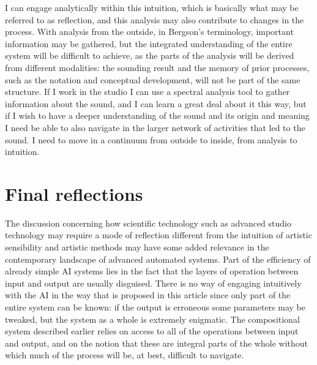 \documentclass[11pt]{article}
\begin{document}
I can engage analytically within this intuition, which is basically what may be referred to as reflection, and this analysis may also contribute to changes in the process.
With analysis from the outside, in Bergson's terminology, important information may be gathered, but the integrated understanding of the entire system will be difficult to achieve, as the parts of the analysis will be derived from different modalities: the sounding result and the memory of prior processes, such as the notation and conceptual development, will not be part of the same structure.
If I work in the studio I can use a spectral analysis tool to gather information about the sound, and I can learn a great deal about it this way, but if I wish to have a deeper understanding of the sound and its origin and meaning I need be able to also navigate in the larger network of activities that led to the sound.
I need to move in a continuum from outside to inside, from analysis to intuition.
\section*{Final reflections}
\label{sec:org028bb71}
The discussion concerning how scientific technology such as advanced studio technology may require a mode of reflection different from the intuition of artistic sensibility  and artistic methods may have some added relevance in the contemporary landscape of advanced automated systems.
Part of the efficiency of already simple AI systems lies in the fact that the layers of operation between input and output are usually disguised.
There is no way of engaging intuitively with the AI in the way that is proposed in this article since only part of the entire system can be known: if the output is erroneous some parameters may be tweaked, but the system as a whole is extremely enigmatic.
The compositional system described earlier relies on access to all of the operations between input and output, and on the notion that these are integral parts of the whole without which much of the process will be, at best, difficult to navigate.
\end{document}
